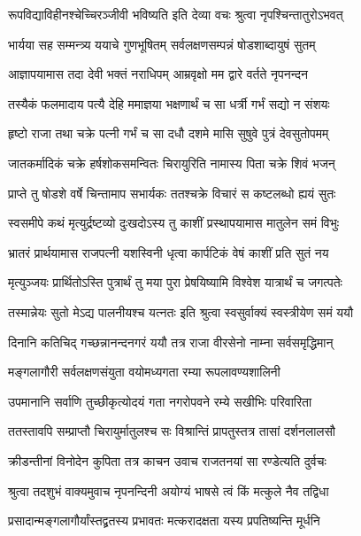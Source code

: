 \twolineshloka
{रूपविद्याविहीनश्चेच्चिरञ्जीवी भविष्यति}
{इति देव्या वचः श्रुत्वा नृपश्चिन्तातुरोऽभवत्} %

\twolineshloka
{भार्यया सह सम्मन्त्र्य ययाचे गुणभूषितम्}
{सर्वलक्षणसम्पन्नं षोडशाब्दायुषं सुतम्} %

\twolineshloka
{आज्ञापयामास तदा देवी भक्तं नराधिपम्}
{आम्रवृक्षो मम द्वारे वर्तते नृपनन्दन} %

\twolineshloka
{तस्यैकं फलमादाय पत्यै देहि ममाज्ञया}
{भक्षणार्थं च सा धर्त्री गर्भं सद्यो न संशयः} %

\twolineshloka
{हृष्टो राजा तथा चक्रे पत्नी गर्भं च सा दधौ}
{दशमे मासि सुषुवे पुत्रं देवसुतोपमम्} %

\twolineshloka
{जातकर्मादिकं चक्रे हर्षशोकसमन्वितः}
{चिरायुरिति नामास्य पिता चक्रे शिवं भजन्} %

\twolineshloka
{प्राप्ते तु षोडशे वर्षे चिन्तामाप सभार्यकः}
{ततश्चक्रे विचारं स कष्टलब्धो ह्ययं सुतः} %

\twolineshloka
{स्वसमीपे कथं मृत्युर्द्रष्टव्यो दुःखदोऽस्य तु}
{काशीं प्रस्थापयामास मातुलेन समं विभुः} %

\twolineshloka
{भ्रातरं प्रार्थयामास राजपत्नी यशस्विनी}
{धृत्वा कार्पटिकं वेषं काशीं प्रति सुतं नय} %

\twolineshloka
{मृत्युञ्जयः प्रार्थितोऽस्ति पुत्रार्थं तु मया पुरा}
{प्रेषयिष्यामि विश्वेश यात्रार्थं च जगत्पतेः} %

\twolineshloka
{तस्मान्नेयः सुतो मेऽद्य पालनीयश्च यत्नतः}
{इति श्रुत्वा स्वसुर्वाक्यं स्वस्त्रीयेण समं ययौ} %

\twolineshloka
{दिनानि कतिचिद् गच्छन्नानन्दनगरं ययौ}
{तत्र राजा वीरसेनो नाम्ना सर्वसमृद्धिमान्} %

\twolineshloka
{मङ्गलागौरी सर्वलक्षणसंयुता}
{वयोमध्यगता रम्या रूपलावण्यशालिनी} %

\twolineshloka
{उपमानानि सर्वाणि तुच्छीकृत्योदयं गता}
{नगरोपवने रम्ये सखीभिः परिवारिता} %

\twolineshloka
{ततस्तावपि सम्प्राप्तौ चिरायुर्मातुलश्च सः}
{विश्रान्तिं प्रापतुस्तत्र तासां दर्शनलालसौ} %

\twolineshloka
{क्रीडन्तीनां विनोदेन कुपिता तत्र काचन}
{उवाच राजतनयां सा रण्डेत्यति दुर्वचः} %

\twolineshloka
{श्रुत्वा तदशुभं वाक्यमुवाच नृपनन्दिनी}
{अयोग्यं भाषसे त्वं किं मत्कुले नैव तद्विधा} %

\twolineshloka
{प्रसादान्मङ्गलागौर्यांस्तद्व्रतस्य प्रभावतः}
{मत्करादक्षता यस्य प्रपतिष्यन्ति मूर्धनि} %

